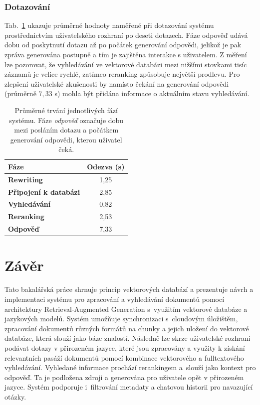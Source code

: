 \newpage

\subsection{Dotazování}
Tab.~\ref{tab:latence} ukazuje průměrné hodnoty naměřené při dotazování systému prostřednictvím uživatelského rozhraní po deseti dotazech. Fáze odpověď udává dobu od poskytnutí dotazu až po počátek generování odpovědi, jelikož je pak zpráva generována postupně a tím je zajištěna interakce s uživatelem. Z měření lze pozorovat, že vyhledávání ve vektorové databázi mezi nižšími stovkami tisíc záznamů je velice rychlé, zatímco reranking způsobuje největší prodlevu. Pro zlepšení uživatelské zkušenosti by namísto čekání na generování odpovědi (průměrně $7{,}33$ s) mohla být přidána informace o aktuálním stavu vyhledávání.
\begin{table}[H]
    \centering
    \renewcommand{\arraystretch}{1.2}
    \begin{tabular}{|l|c|}
        \hline
        \textbf{Fáze} & \textbf{Odezva (s)} \\
        \hline
        \textbf{Rewriting}            & 1{,}25 \\
        \textbf{Připojení k databázi}         & 2{,}85 \\
        \textbf{Vyhledávání}        & 0{,}82 \\
        \textbf{Reranking}              & 2{,}53 \\
        \textbf{Odpověď}  & 7{,}33 \\
        \hline
    \end{tabular}
    \caption{Průměrné trvání jednotlivých fází systému. Fáze \textit{odpověď} označuje dobu mezi posláním dotazu a počátkem generování odpovědi, kterou uživatel čeká.}
    \label{tab:latence}
\end{table}


\chapter{Závěr}

Tato bakalářská práce shrnuje princip vektorových databází a prezentuje návrh a implementaci systému pro zpracování a vyhledávání dokumentů pomocí architektury Retrieval-Augmented Generation s~využitím vektorové databáze a jazykových modelů. Systém umožňuje synchronizaci s~cloudovým úložištěm, zpracování dokumentů různých formátů na chunky a jejich uložení do vektorové databáze, která slouží jako báze znalostí. Následně lze skrze uživatelské rozhraní podávat dotazy v přirozeném jazyce, které jsou zpracovány a využity k získání relevantních pasáží dokumentů pomocí kombinace vektorového a fulltextového vyhledávání. Vyhledané informace prochází rerankingem a~slouží jako kontext pro odpověď. Ta je podložena zdroji a generována pro uživatele opět v přirozeném jazyce. Systém podporuje i~filtrování metadaty a chatovou historii pro navazující otázky. 

